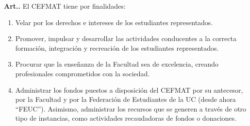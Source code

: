\documentclass[letterpaper,11pt]{article}
\newcounter{art}
\newenvironment{art}{\refstepcounter{art}\mbox{\textbf{Art.{\space}\theart.}}\ignorespaces}{}
\begin{document}
\begin{art}\label{finalidadesCEFMAT}
    El CEFMAT tiene por finalidades:
    \begin{enumerate}
        \item Velar por los derechos e intereses de los estudiantes representados.
        \item Promover, impulsar y desarrollar las actividades conducentes a la correcta formación, integración y recreación de los estudiantes representados.
        \item Procurar que la enseñanza de la Facultad sea de excelencia, creando profesionales comprometidos con la sociedad.
        \item Administrar los fondos puestos a disposición del CEFMAT por su antecesor, por la Facultad y por la Federación de Estudiantes de la UC (desde ahora ``FEUC''). Asimismo, administrar los recursos que se generen a través de otro tipo de instancias, como actividades recaudadoras de fondos o donaciones.
    \end{enumerate}
\end{art}
\end{document}
